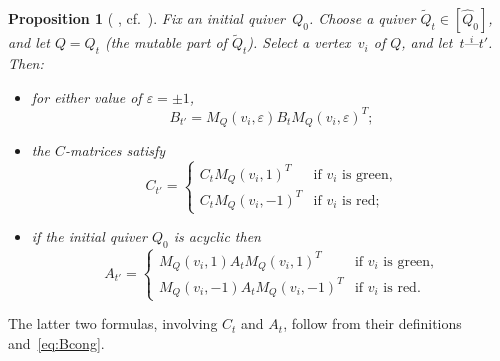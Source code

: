 \documentclass[11pt, letterpaper]{amsart}
\newtheorem{proposition}[theorem]{Proposition}
\theoremstyle{definition}
\numberwithin{equation}{section}
\begin{document}
\begin{proposition}[{ {\cite[Theorem 2.8.3]{CAtextbook1-3}}, cf.\ {\cite[Lemma 3.1]{SevenAMatrices}}}]
\label{prop:A matrix mutation acyclic}
Fix an initial quiver~$Q_0$.
Choose a quiver $\tilde Q_t \in [\widehat Q_0]$, and let $Q = Q_t$ (the mutable part of $\tilde Q_t$).
Select a vertex~$v_i$ of $Q$, and let~$t \stackrel{i}{\text{---}} t'$.
Then:
\begin{itemize}
\item for either value of $\varepsilon=\pm1$, 
\begin{equation}
\label{eq:Bcong}
B_{t'} = M_Q(v_i, \varepsilon) B_t M_Q(v_i, \varepsilon)^T;
\end{equation}
\item the $C$-matrices satisfy $$ C_{t'} = \begin{cases} C_t M_Q(v_i, 1)^T & \text{if $v_i$ is green,} \\ C_t M_Q(v_i, -1)^T & \text{if $v_i$ is red;} \end{cases}$$ %
\item if the initial quiver $Q_0$ is acyclic then %
$$A_{t'} = \begin{cases} M_Q(v_i, 1) A_t M_Q(v_i, 1)^T & \text{if $v_i$ is green,} \\ M_Q(v_i, -1) A_t M_Q(v_i, -1)^T  & \text{if $v_i$ is red.}\end{cases}$$ %
\end{itemize}
\end{proposition}

The latter two formulas, involving $C_t$ and $A_t$, follow from their definitions and~\eqref{eq:Bcong}.

\pagebreak[2]
\end{document}
